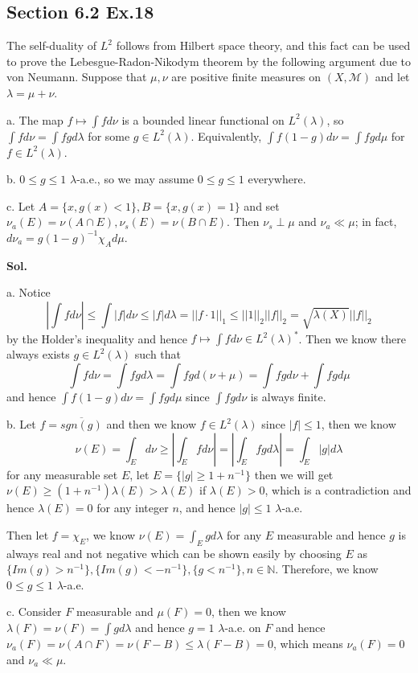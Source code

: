 \documentclass[lang=en,11pt,a4paper,citestyle =authoryear]{elegantpaper}
\newcommand{\N}{\mathbb{N}}
\newcommand{\M}{\mathcal{M}}
\begin{document}
\subsection*{Section 6.2 Ex.18} 
The self-duality of $L^2$ follows from Hilbert space theory, and this fact can be used to prove the Lebesgue-Radon-Nikodym theorem by the following argument due to von Neumann. Suppose that $\mu,\nu$ are positive finite measures on $(X,\M)$ and let $\lambda = \mu+\nu$.\par
a. The map $f\mapsto \int f d\nu$ is a bounded linear functional on $L^2(\lambda)$, so $\int f d\nu = \int fg d\lambda$ for some $g\in L^2(\lambda)$. Equivalently, $\int f(1-g)d\nu = \int fg d\mu$ for $f\in L^2(\lambda)$.\par
b. $0\leq g \leq 1$ $\lambda$-a.e., so we may assume $0\leq g \leq 1$ everywhere.\par
c. Let $A=\{x,g(x)<1\},B=\{x,g(x)=1\}$ and set $\nu_a(E)=\nu(A\cap E),\nu_s(E)=\nu(B\cap E)$. Then $\nu_s \perp \mu$ and $\nu_a \ll \mu$; in fact, $d\nu_a = g(1-g)^{-1}\chi_Ad\mu$.\par
\vspace{0.5em}
\textbf{Sol.} \par
a. Notice
\[|\int f d\nu| \leq \int |f|d\nu \leq |f|d\lambda = ||f\cdot 1||_1 \leq ||1||_2||f||_2 = \sqrt{\lambda(X)}||f||_2\]
by the Holder's inequality and hence $f\mapsto \int fd\nu\in L^2(\lambda)^*$. Then we know there always exists $g\in L^2(\lambda)$ such that 
\[\int f d\nu = \int fg d\lambda = \int fg d(\nu+\mu) = \int fgd\nu + \int fg d\mu\]
and hence $\int f(1-g)d\nu = \int fg d\mu$ since $\int fg d\nu$ is always finite.\par
b. Let $f = \overline{sgn(g)}$ and then we know $f\in L^2(\lambda)$ since $|f|\leq 1$, then we know 
\[ \nu(E) = \int_{E} d\nu \geq |\int_{E} fd\nu| = |\int_{E} fg d\lambda| = \int_{E} |g| d\lambda\]
for any measurable set $E$, let $E = \{|g|\geq 1+n^{-1}\}$ then we will get $\nu(E) \geq (1+n^{-1})\lambda(E) > \lambda(E)$ if $\lambda(E) > 0$, which is a contradiction and hence $\lambda(E) = 0$ for any integer $n$, and hence $|g|\leq 1$ $\lambda$-a.e.\par
Then let $f = \chi_E$, we know $\nu(E) = \int_E g d\lambda$ for any $E$ measurable and hence $g$ is always real and not negative which can be shown easily by choosing $E$ as $\{Im(g) > n^{-1}\}, \{Im(g) < -n^{-1}\}, \{g<n^{-1}\},n\in\N$. Therefore, we know $0\leq g\leq 1$ $\lambda$-a.e.\par
c. Consider $F$ measurable and $\mu(F) = 0$, then we know $\lambda(F) = \nu(F) = \int gd\lambda$ and hence $g=1$ $\lambda$-a.e. on $F$ and hence $\nu_a(F) = \nu(A\cap F) = \nu(F-B) \leq \lambda(F-B) = 0$, which means $\nu_a(F) = 0$ and $\nu_a\ll \mu$.\par
\end{document}
